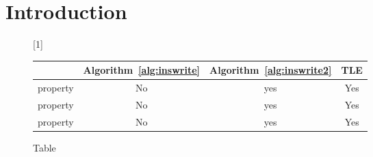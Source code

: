 \section{Introduction}
\label{sec:intro}
%


\begin{figure*}[!ht]
      
     \scalebox{1}[1]{
     \begin{tabularx}{\textwidth}{c|c|c|c}
	~~~~~ & Algorithm~\ref{alg:inswrite} & Algorithm~\ref{alg:inswrite2} & TLE\\ \hline
	property & No & yes & Yes \\ \hline
	property & No & yes & Yes \\ \hline
	property & No & yes & Yes 
   \end{tabularx}
\caption{Table}\label{fig:main}    
}
\end{figure*}